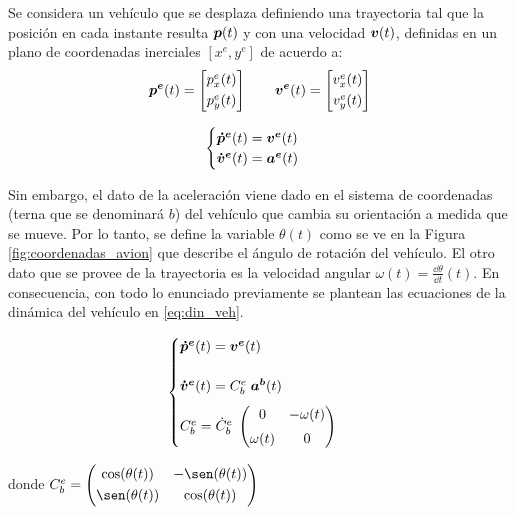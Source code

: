 
	Se considera un vehículo que se desplaza definiendo una trayectoria tal que la posición en cada instante resulta $\boldsymbol{p}(t)$ y con una velocidad $\boldsymbol{v}(t)$, definidas en un plano de coordenadas inerciales $[x^e,y^e]$ de acuerdo a:
	\begin{equation*}
		\vect{p^e}(t) = \begin{bmatrix} p^e_x(t) \\[0.3em] p^e_y(t) \end{bmatrix} \qquad%
		\vect{v^e}(t) = \begin{bmatrix} v^e_x(t) \\[0.3em] v^e_y(t) \end{bmatrix}
	\end{equation*}

	\begin{equation}
		\begin{cases}
			\boldsymbol{\dot{p}^e}(t) = \boldsymbol{v^e}(t)\\
			\boldsymbol{\dot{v}^e}(t) = \boldsymbol{a^e}(t)\\
		\end{cases}
		\label{eq:din_inercial}
	\end{equation}

	Sin embargo, el dato de la aceleración viene dado en el sistema de coordenadas (terna que se denominará $b$) del vehículo que cambia su orientación a medida que se mueve. Por lo tanto, se define la variable $\theta(t)$ como se ve en la 
	Figura \ref{fig:coordenadas_avion} que describe el ángulo de rotación del vehículo. El otro dato que se provee de la trayectoria es la velocidad angular $\omega(t) = \frac{\dd \theta}{\dd t} (t)$. En consecuencia, con todo lo enunciado previamente se plantean las ecuaciones de la dinámica del vehículo en \eqref{eq:din_veh}.

	\begin{equation}
		\begin{cases}
			\boldsymbol{\dot{p}^e}(t) = \boldsymbol{v^e}(t)\\[1.4em]
			\boldsymbol{\dot{v}^e}(t) = C^e_b \; \boldsymbol{a^b}(t)\\[0.6em]
			{C^e_b} = \dot{C}^e_b \; \begin{pmatrix} 0& -\omega(t)\\[0.3em] \omega(t)&0 \end{pmatrix}
		\end{cases}
		\label{eq:din_veh}
	\end{equation}

	donde $C^e_b = \begin{pmatrix} \cos(\theta(t)) & -\sen(\theta(t))\\[0.3em] \sen(\theta(t)) & \cos(\theta(t))\end{pmatrix}$




